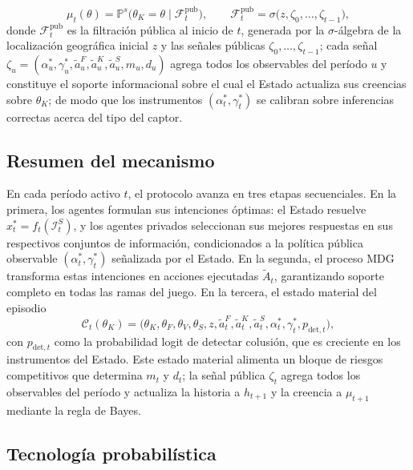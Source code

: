 \documentclass[pdflatex,sn-mathphys-ay]{sn-jnl}
\theoremstyle{thmstyleone}
\theoremstyle{thmstyletwo}
\theoremstyle{thmstylethree}
\newcommand{\Prob}{\mathbb{P}}
\newcommand{\1}{\mathbf{1}}
\begin{document}
\[
\mu_t(\theta)=\Prob^s\!\bigl(\theta_K=\theta\mid\mathcal{F}_t^{\mathrm{pub}}\bigr),\qquad \mathcal{F}_t^{\mathrm{pub}}=\sigma\bigl(z,\zeta_0,\ldots,\zeta_{t-1}\bigr),
\]
donde $\mathcal{F}_t^{\mathrm{pub}}$ es la filtración pública al inicio de $t$, generada por la $\sigma$-álgebra de la localización geográfica inicial $z$ y las señales públicas $\zeta_0,\ldots,\zeta_{t-1}$; cada señal $\zeta_u=(\alpha_u^\ast,\gamma_u^\ast,\tilde{a}_u^F,\tilde{a}_u^K,\tilde{a}_u^S,m_u,d_u)$ agrega todos los observables del período $u$ y constituye el soporte informacional sobre el cual el Estado actualiza sus creencias sobre $\theta_K$; de modo que los instrumentos $(\alpha_t^\ast,\gamma_t^\ast)$ se calibran sobre inferencias correctas acerca del tipo del captor.

\subsection{Resumen del mecanismo}\label{subsec:resumen-mecanismo}

En cada período activo $t$, el protocolo avanza en tres etapas secuenciales. En la primera, los agentes formulan sus intenciones óptimas: el Estado resuelve $x_t^\ast=f_t(\mathcal{I}_t^S)$, y los agentes privados seleccionan sus mejores respuestas en sus respectivos conjuntos de información, condicionados a la política pública observable $(\alpha_t^\ast,\gamma_t^\ast)$ señalizada por el Estado. En la segunda, el proceso MDG transforma estas intenciones en acciones ejecutadas $\tilde{A}_t$, garantizando soporte completo en todas las ramas del juego. En la tercera, el estado material del episodio
\[
\mathcal{C}_t(\theta_K)=\bigl(\theta_K,\theta_F,\theta_V,\theta_S,z,\tilde{a}_t^F,\tilde{a}_t^K,\tilde{a}_t^S,\alpha_t^\ast,\gamma_t^\ast,p_{\mathrm{det},t}\bigr),
\]
con $p_{\mathrm{det},t}$ como la probabilidad logit de detectar colusión, que es creciente en los instrumentos del Estado. Este estado material alimenta un bloque de riesgos competitivos que determina $m_t$ y $d_t$; la señal pública $\zeta_t$ agrega todos los observables del período y actualiza la historia a $h_{t+1}$ y la creencia a $\mu_{t+1}$ mediante la regla de Bayes.

\subsection{Tecnología probabilística}\label{subsec:prob-tech}
\end{document}
